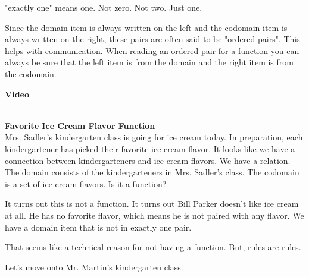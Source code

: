 \documentclass{ximera}
\begin{document}
\begin{observation} 
"exactly one" means one. Not zero. Not two. Just one.
\end{observation}

\begin{observation} 
Since the domain item is always written on the left and the codomain item is always written on the right, these pairs are often said to be "ordered pairs". This helps with communication. When reading an ordered pair for a function you can always be sure that the left item is from the domain and the right item is from the codomain.
\end{observation}


\begin{explanation} \textbf{Video}
\begin{center}
\end{center}
\end{explanation}

\quad \\


\textbf{Favorite Ice Cream Flavor Function} \\

Mrs. Sadler's kindergarten class is going for ice cream today.  In preparation, each kindergartener has picked their favorite ice cream flavor. It looks like we have a connection between kindergarteners and ice cream flavors.  We have a relation.  The domain consists of the kindergarteners in Mrs. Sadler's class.  The codomain is a set of ice cream flavors. Is it a function?

It turns out this is not a function.  It turns out Bill Parker doesn't like ice cream at all. He has no favorite flavor, which means he is not paired with any flavor.  We have a domain item that is not in exactly one pair.

That seems like a technical reason for not having a function.  But, rules are rules.  

Let's move onto Mr. Martin's kindergarten class.
\end{document}
